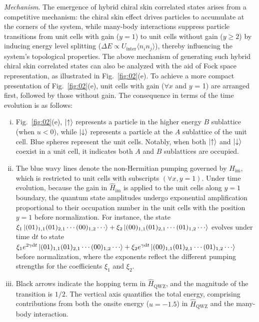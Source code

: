 \documentclass[longbibliography, aps, prx, amsmath, amssymb, amsfonts, twocolumn,superscriptaddress, footinbib]{revtex4-1}
\begin{document}
	\textit{Mechanism}. The emergence of hybrid chiral skin correlated states arises from a competitive mechanism: the chiral skin effect drives particles to accumulate at the corners of the system, while many-body interactions suppress particle transitions from unit cells with gain ($y=1$) to unit cells without gain ($y \geq 2$) by inducing energy level splitting ($\Delta E \propto U_{\text{inter}}\langle n_i n_j \rangle$), thereby influencing the system's topological properties.
	The above mechanism of generating such hybrid chiral skin correlated states can also be analyzed with the aid of Fock space representation, as illustrated in Fig.~\ref{fig:02}(e). 
	To achieve a more compact presentation of Fig.~\ref{fig:02}(e), unit cells with gain ($\forall x$ and $y$ = 1) are arranged first, followed by those without gain. The consequence in terms of the time evolution is as follows:
	\begin{enumerate}[(i)]
		\item Fig.~\ref{fig:02}(e), $\ket{\uparrow}$ represents a particle in the higher energy $B$ sublattice (when $u<0$), while $\ket{\downarrow}$ represents a particle at the $A$ sublattice of the unit cell. 
		Blue spheres represent the unit cells.
		Notably, when both $\ket{\uparrow}$ and $\ket{\downarrow}$ coexist in a unit cell, it indicates both $A$ and $B$ sublattices are occupied.
		\item The blue wavy lines denote the non-Hermitian pumping governed by $\hat{H}_{\text{im}}$, which is restricted to unit cells with subscripts $(\forall x,y=1)$. Under time evolution, because the gain in $\hat{H}_{\text{im}}$ is applied to the unit cells along $y=1$ boundary, the quantum state amplitudes undergo exponential amplification proportional to their occupation number in the unit cells with the position $y=1$ before normalization. For instance, the state $\xi_1 \ket{(01)_{1,1}(01)_{2,1}\cdots(00)_{1,2}\cdots} + \xi_2\ket{(00)_{1,1}(01)_{2,1}\cdots(01)_{1,2}\cdots}$ evolves under time $\mathrm{d}t$ to state $\xi_1 e^{2\gamma \mathrm{d}t} \ket{(01)_{1,1}(01)_{2,1}\cdots(00)_{1,2}\cdots} + \xi_2 e^{\gamma \mathrm{d}t} \ket{(00)_{1,1}(01)_{2,1}\cdots(01)_{1,2}\cdots}$ before normalization, where the exponents reflect the different pumping strengths for the coefficients $\xi_1$ and $\xi_2$. 
		\item Black arrows indicate the hopping term in $\hat{H}_{\text{QWZ}}$, and the magnitude of the transition is $1/2$. The vertical axis quantifies the total energy, comprising contributions from both the onsite energy ($u=-1.5$) in $\hat{H}_{\text{QWZ}}$ and the many-body interaction.
	\end{enumerate}
\end{document}
